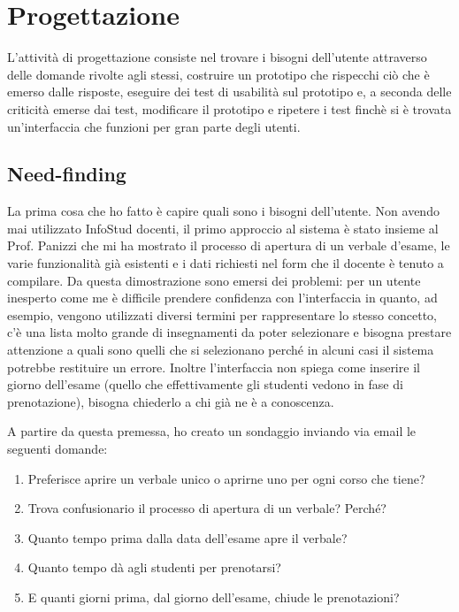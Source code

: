 \documentclass[Lau, oneside, noexaminfo]{sapthesis}%
\begin{document}
\chapter{Progettazione}
\label{ch:3}

L'attività di progettazione consiste nel trovare i bisogni dell'utente attraverso delle domande rivolte agli stessi, costruire un prototipo che rispecchi ciò che è emerso dalle risposte, eseguire dei test di usabilità sul prototipo e, a seconda delle criticità emerse dai test, modificare il prototipo e ripetere i test finchè si è trovata un'interfaccia che funzioni per gran parte degli utenti.

\section{Need-finding}
\label{sec:nf}
La prima cosa che ho fatto è capire quali sono i bisogni dell'utente. Non avendo mai utilizzato InfoStud docenti, il primo approccio al sistema è stato insieme al Prof. Panizzi che mi ha mostrato il processo di apertura di un verbale d'esame, le varie funzionalità già esistenti e i dati richiesti nel form che il docente è tenuto a compilare. Da questa dimostrazione sono emersi dei problemi: per un utente inesperto come me è difficile prendere confidenza con l'interfaccia in quanto, ad esempio, vengono utilizzati diversi termini per rappresentare lo stesso concetto, c'è una lista molto grande di insegnamenti da poter selezionare e bisogna prestare attenzione a quali sono quelli che si selezionano perché in alcuni casi il sistema potrebbe restituire un errore. Inoltre l'interfaccia non spiega come inserire il giorno dell'esame (quello che effettivamente gli studenti vedono in fase di prenotazione), bisogna chiederlo a chi già ne è a conoscenza.

A partire da questa premessa, ho creato un sondaggio inviando via email le seguenti domande:

\begin{enumerate}
	\item Preferisce aprire un verbale unico o aprirne uno per ogni corso che tiene? 
	\item Trova confusionario il processo di apertura di un verbale? Perché?
	\item Quanto tempo prima dalla data dell'esame apre il verbale?
	\item Quanto tempo dà agli studenti per prenotarsi?
	\item E quanti giorni prima, dal giorno dell'esame, chiude le prenotazioni? 
\end{enumerate}
\end{document}
